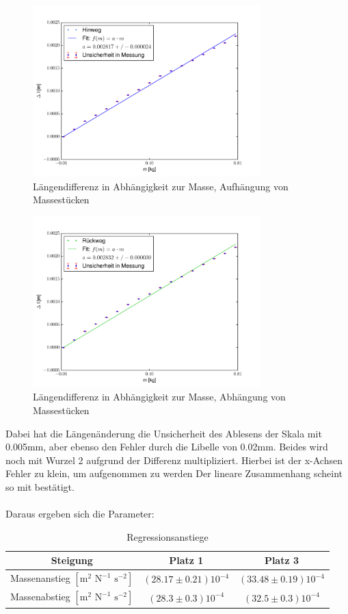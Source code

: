 \documentclass[bibliography=totocnumbered]{scrartcl}
\begin{document}
	\begin{figure}[!ht]
		\centering								 
		\includegraphics[width=250pt]{fotos/gpr1/M3_MR1_S.pdf}			 
		\caption[Messreihe 1, Platz 1]{Längendifferenz in Abhängigkeit zur Masse, Aufhängung von Massestücken}							 
		\label{Abb: M1, P1}							 
	\end{figure}

\begin{figure}[!ht]
	\centering								 
	\includegraphics[width=250pt]{fotos/gpr1/M3_MR2_S.pdf}			 
	\caption[Messreihe 2, Platz 1]{Längendifferenz in Abhängigkeit zur Masse, Abhängung von Massestücken}							 
	\label{Abb: M2, P1}							 
\end{figure}
	
	\newpage
	
	Dabei hat die Längenänderung die Unsicherheit des Ablesens der Skala mit 0.005mm, aber ebenso den Fehler durch die Libelle von 0.02mm. Beides wird noch mit Wurzel 2 aufgrund der Differenz multipliziert.\smartcite{MullerPG.2007b}
	Hierbei ist der x-Achsen Fehler zu klein, um aufgenommen zu werden
	Der lineare Zusammenhang scheint so mit bestätigt.
	\\\\
	Daraus ergeben sich die Parameter:
	\begin{table}[ht!]
		\centering
		\caption{Regressionsanstiege}
		\begin{tabular}{|c|c|c|}
			\hline
			Steigung & Platz 1 & Platz 3 \\
			\hline
			Massenanstieg $ \left[\text{m}^{2}\text{ N}^{-1}\text{ s}^{-2}\right] $& $ (28.17\pm 0.21)10^{-4} $ & $ (33.48 \pm 0.19)10^{-4} $ \\
			\hline
			Massenabstieg $ \left[\text{m}^{2}\text{ N}^{-1}\text{ s}^{-2}\right] $& $ (28.3 \pm0.3 )10^{-4} $ &$ (32.5 \pm 0.3)10^{-4} $  \\
			\hline
		\end{tabular}
		\label{tab: Regr. anstiege}
	\end{table}
	
\end{document}
